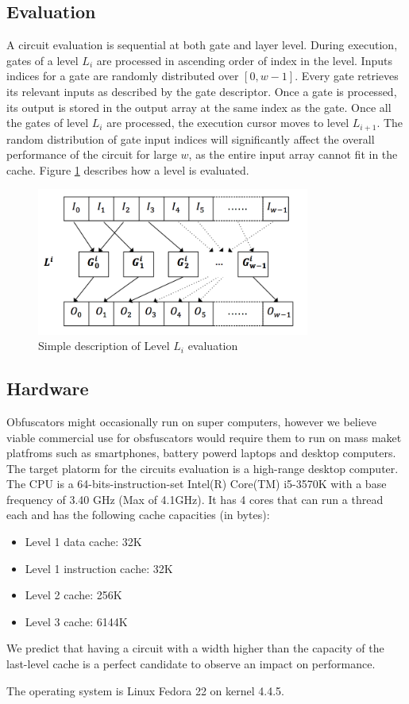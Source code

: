 \subsection{Evaluation}
A circuit evaluation is sequential at both gate and layer level. During execution, gates of a level $L_i$ are processed in ascending order of index in the level. Inputs indices for a gate are randomly distributed over $[0, w−1]$. Every gate retrieves its relevant inputs as described by the gate descriptor. Once a gate is processed, its output is stored in the output array at the same index as the gate. Once all the gates of level $L_i$ are processed, the execution cursor moves to level $L_{i+1}$. The random distribution of gate input indices will significantly affect the overall performance of the circuit for large $w$, as the entire input array cannot fit in the cache. Figure \ref{fig:level} describes how a level is evaluated.
\begin{figure}[h]
	\center
	\includegraphics[width=0.8\textwidth]{img/level.png}
	\caption{Simple description of Level $L_i$ evaluation}
	\label{fig:level}
\end{figure}
\par
\subsection{Hardware}
Obfuscators might occasionally run on super computers, however we believe viable commercial use for obsfuscators would require them to run on mass maket platfroms such as smartphones, battery powerd laptops and desktop computers\cite{clark}. The target platorm for the circuits evaluation is a high-range desktop computer. The CPU is a 64-bits-instruction-set Intel(R) Core(TM) i5-3570K with a base frequency of 3.40 GHz (Max of 4.1GHz). It has 4 cores that can run a thread each and has the following cache capacities (in bytes): 
\begin{itemize}[noitemsep]
\item Level 1 data cache: 32K
\item Level 1 instruction cache: 32K
\item Level 2 cache: 256K
\item Level 3 cache: 6144K
\end{itemize}
We predict that having a circuit with a width higher than the capacity of the last-level cache is a perfect candidate to observe an impact on performance.
\par
The operating system is Linux Fedora 22 on kernel 4.4.5.


